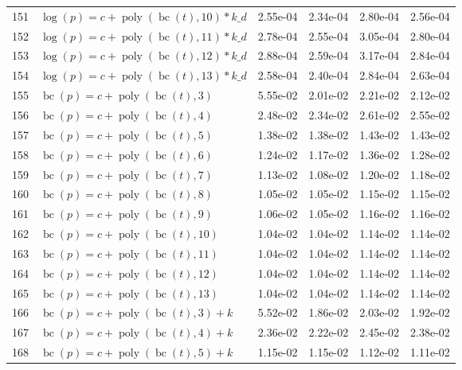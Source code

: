\documentclass[12pt,a4paper]{article}
\DeclareMathOperator{\bc}{bc}
\DeclareMathOperator{\poly}{poly}
\begin{document}
\begin{longtable}[t]{ll>{\raggedleft\arraybackslash}p{2cm}>{\raggedleft\arraybackslash}p{2cm}>{\raggedleft\arraybackslash}p{2cm}>{\raggedleft\arraybackslash}p{2cm}}
\rowcolor{gray!6}  151 & $\log(p) = c + \poly\left( \bc(t), 10 \right) * k\_d$ & 2.55e-04 & 2.34e-04 & 2.80e-04 & 2.56e-04\\
152 & $\log(p) = c + \poly\left( \bc(t), 11 \right) * k\_d$ & 2.78e-04 & 2.55e-04 & 3.05e-04 & 2.80e-04\\
\rowcolor{gray!6}  153 & $\log(p) = c + \poly\left( \bc(t), 12 \right) * k\_d$ & 2.88e-04 & 2.59e-04 & 3.17e-04 & 2.84e-04\\
154 & $\log(p) = c + \poly\left( \bc(t), 13 \right) * k\_d$ & 2.58e-04 & 2.40e-04 & 2.84e-04 & 2.63e-04\\
\rowcolor{gray!6}  155 & $\bc(p) = c + \poly\left( \bc(t), 3 \right)$ & 5.55e-02 & 2.01e-02 & 2.21e-02 & 2.12e-02\\
156 & $\bc(p) = c + \poly\left( \bc(t), 4 \right)$ & 2.48e-02 & 2.34e-02 & 2.61e-02 & 2.55e-02\\
\rowcolor{gray!6}  157 & $\bc(p) = c + \poly\left( \bc(t), 5 \right)$ & 1.38e-02 & 1.38e-02 & 1.43e-02 & 1.43e-02\\
158 & $\bc(p) = c + \poly\left( \bc(t), 6 \right)$ & 1.24e-02 & 1.17e-02 & 1.36e-02 & 1.28e-02\\
\rowcolor{gray!6}  159 & $\bc(p) = c + \poly\left( \bc(t), 7 \right)$ & 1.13e-02 & 1.08e-02 & 1.20e-02 & 1.18e-02\\
160 & $\bc(p) = c + \poly\left( \bc(t), 8 \right)$ & 1.05e-02 & 1.05e-02 & 1.15e-02 & 1.15e-02\\
\rowcolor{gray!6}  161 & $\bc(p) = c + \poly\left( \bc(t), 9 \right)$ & 1.06e-02 & 1.05e-02 & 1.16e-02 & 1.16e-02\\
162 & $\bc(p) = c + \poly\left( \bc(t), 10 \right)$ & 1.04e-02 & 1.04e-02 & 1.14e-02 & 1.14e-02\\
\rowcolor{gray!6}  163 & $\bc(p) = c + \poly\left( \bc(t), 11 \right)$ & 1.04e-02 & 1.04e-02 & 1.14e-02 & 1.14e-02\\
164 & $\bc(p) = c + \poly\left( \bc(t), 12 \right)$ & 1.04e-02 & 1.04e-02 & 1.14e-02 & 1.14e-02\\
\rowcolor{gray!6}  165 & $\bc(p) = c + \poly\left( \bc(t), 13 \right)$ & 1.04e-02 & 1.04e-02 & 1.14e-02 & 1.14e-02\\
166 & $\bc(p) = c + \poly\left( \bc(t), 3 \right) + k$ & 5.52e-02 & 1.86e-02 & 2.03e-02 & 1.92e-02\\
\rowcolor{gray!6}  167 & $\bc(p) = c + \poly\left( \bc(t), 4 \right) + k$ & 2.36e-02 & 2.22e-02 & 2.45e-02 & 2.38e-02\\
168 & $\bc(p) = c + \poly\left( \bc(t), 5 \right) + k$ & 1.15e-02 & 1.15e-02 & 1.12e-02 & 1.11e-02\\

\end{longtable}
\end{document}
